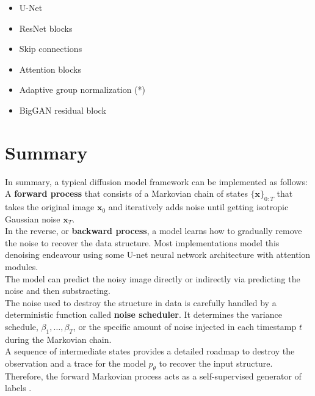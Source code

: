\begin{itemize}
    \item U-Net
    \item ResNet blocks
    \item Skip connections
    \item Attention blocks
    \item Adaptive group normalization (*)
    \item BigGAN residual block
\end{itemize}


\section{Summary}

In summary, a typical diffusion model framework can be implemented as follows:\\

A \textbf{forward process} that consists of a Markovian chain of states $\{\mathbf{x}\}_{0:T}$ that takes the original image $\mathbf{x}_0$ and iteratively adds noise until getting isotropic Gaussian noise $\mathbf{x}_{T}$. \\

In the reverse, or \textbf{backward process}, a model learns how to gradually remove the noise to recover the data structure. Most implementations model this denoising endeavour using some U-net neural network architecture with attention modules. \\

The model can predict the noisy image directly or indirectly via predicting the noise and then substracting. \\

The noise used to destroy the structure in data is carefully handled by a deterministic function called \textbf{noise scheduler}. It determines the variance schedule, $\beta_{1}, \dots, \beta_{T}$, or the specific amount of noise injected in each timestamp $t$ during the Markovian chain. \\

A sequence of intermediate states provides a detailed roadmap to destroy the observation and a trace for the model $p_{\theta}$ to recover the input structure. Therefore, the forward Markovian process acts as a self-supervised generator of labels .\\

